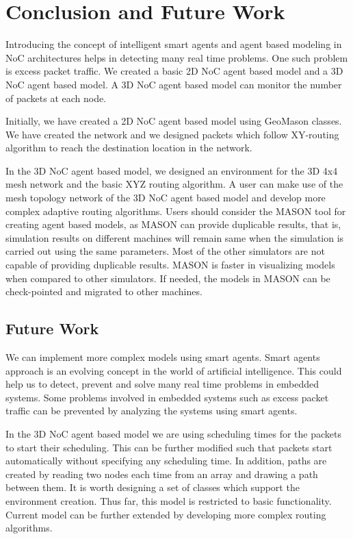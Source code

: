 \chapter{Conclusion and Future Work}
\label{Chapter.seven}

Introducing the concept of intelligent smart agents and agent based modeling in NoC architectures helps in detecting many real time problems. One such problem is excess packet traffic. We created a basic 2D NoC agent based model and a 3D NoC agent based model. A 3D NoC agent based model can monitor the number of packets at each node.

Initially, we have created a 2D NoC agent based model using GeoMason classes. We have created the network and we designed packets which follow XY-routing algorithm to reach the destination location in the network. 

In the 3D NoC agent based model, we designed an environment for the 3D 4x4 mesh network and the basic XYZ routing algorithm. A user can make use of the mesh topology network of the 3D NoC agent based model and develop more complex adaptive routing algorithms. Users should consider the MASON tool for creating agent based models, as MASON can provide duplicable results, that is, simulation results on different machines will remain same when the simulation is carried out using the same parameters. Most of the other simulators are not capable of providing duplicable results. MASON is faster in visualizing models when compared to other simulators. If needed, the models in MASON can be check-pointed and migrated to other machines.

\section{Future Work}
We can implement more complex models using smart agents. Smart agents approach is an evolving concept in the world of artificial intelligence. This could help us to detect, prevent and solve many real time problems in embedded systems. Some problems involved in embedded systems such as excess packet traffic can be prevented by analyzing the systems using smart agents.

In the 3D NoC agent based model we are using scheduling times for the packets to start their scheduling. This can be further modified such that packets start automatically without specifying any scheduling time. In addition, paths are created by reading two nodes each time from an array and drawing a path between them. It is worth designing a set of classes which support the environment creation. Thus far, this model is restricted to basic functionality. Current model can be further extended by developing more complex routing algorithms. 


 
 
  
  
 
 

